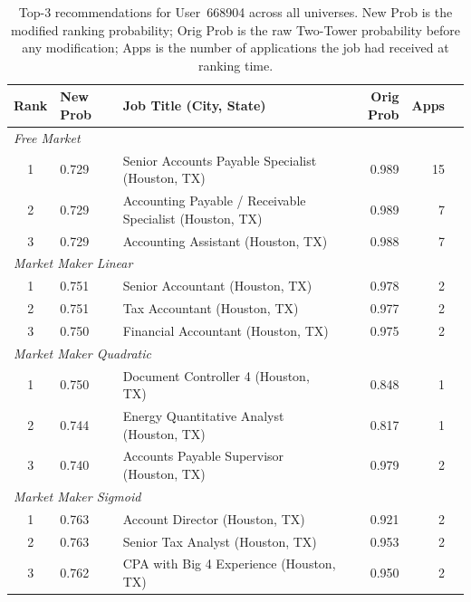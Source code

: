 \begin{table}[H]
    \centering
    \caption{Top-3 recommendations for User~668904 across all universes.
    New Prob is the modified ranking probability; Orig Prob is the raw
    Two-Tower probability before any modification; Apps is the number of
    applications the job had received at ranking time.}
    \label{tab:sanity_668904}
    \begin{tabular}{@{}clp{5.5cm}rrr@{}}
        \toprule
        \textbf{Rank} & \textbf{New Prob} & \textbf{Job Title (City, State)} & \textbf{Orig Prob} & \textbf{Apps} \\
        \midrule
        \multicolumn{5}{l}{\textit{Free Market}} \\
        1 & 0.729 & Senior Accounts Payable Specialist (Houston, TX)         & 0.989 & 15 \\
        2 & 0.729 & Accounting Payable / Receivable Specialist (Houston, TX) & 0.989 &  7 \\
        3 & 0.729 & Accounting Assistant (Houston, TX)                       & 0.988 &  7 \\
        \midrule
        \multicolumn{5}{l}{\textit{Market Maker Linear}} \\
        1 & 0.751 & Senior Accountant (Houston, TX)           & 0.978 & 2 \\
        2 & 0.751 & Tax Accountant (Houston, TX)              & 0.977 & 2 \\
        3 & 0.750 & Financial Accountant (Houston, TX)        & 0.975 & 2 \\
        \midrule
        \multicolumn{5}{l}{\textit{Market Maker Quadratic}} \\
        1 & 0.750 & Document Controller 4 (Houston, TX)       & 0.848 & 1 \\
        2 & 0.744 & Energy Quantitative Analyst (Houston, TX) & 0.817 & 1 \\
        3 & 0.740 & Accounts Payable Supervisor (Houston, TX) & 0.979 & 2 \\
        \midrule
        \multicolumn{5}{l}{\textit{Market Maker Sigmoid}} \\
        1 & 0.763 & Account Director (Houston, TX)            & 0.921 & 2 \\
        2 & 0.763 & Senior Tax Analyst (Houston, TX)          & 0.953 & 2 \\
        3 & 0.762 & CPA with Big 4 Experience (Houston, TX)   & 0.950 & 2 \\
        \bottomrule
    \end{tabular}
\end{table}

